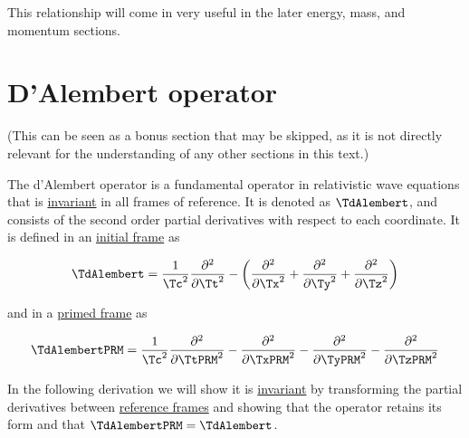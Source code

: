This relationship will come in very useful in the later energy, mass, and momentum sections.

\section{D'Alembert operator}\label{sect: D'Alembert operator}

\begin{note}
	(This can be seen as a bonus section that may be skipped, as it is not directly relevant for the understanding of any other sections in this text.)
\end{note}

The d'Alembert operator is a fundamental operator in relativistic wave equations that is \hyperlink{def-lorentz-invariant}{invariant} in all frames of reference.
It is denoted as $\TdAlembert $, and consists of the second order partial derivatives with respect to each coordinate.
It is defined in an \hyperlink{def-initial-Frame}{initial frame} as

\begin{equation}
	\label{eq: d Alembert operator}
	\TdAlembert  = \frac{1}{\Tc ^2}\frac{\partial^2}{\partial \Tt ^2} - \left(\frac{\partial^2}{\partial \Tx ^2} + \frac{\partial^2}{\partial \Ty ^2} + \frac{\partial^2}{\partial \Tz ^2}\right)
\end{equation}

and in a \hyperlink{def-Primed-Frame}{primed frame} as

\begin{equation}
	\TdAlembertPRM  = \frac{1}{\Tc ^2} \frac{\partial^2}{\partial \TtPRM ^2} - \frac{\partial^2}{\partial \TxPRM ^2} - \frac{\partial^2}{\partial \TyPRM ^2} - \frac{\partial^2}{\partial \TzPRM ^2}
\end{equation}

In the following derivation we will show it is \hyperlink{def-lorentz-invariant}{invariant} by transforming the partial derivatives between \hyperlink{def-Reference-frame}{reference frames} and showing that the operator retains its form and that $\TdAlembertPRM =\TdAlembert $.


